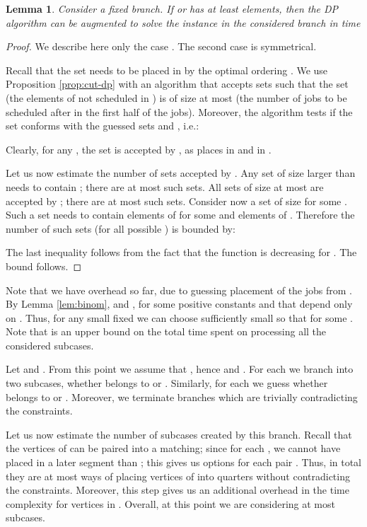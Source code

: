 \documentclass{article}
\newtheorem{lemma}[theorem]{Lemma}
\theoremstyle{definition}
\begin{document}
\begin{lemma}\label{lem:half}
Consider a fixed branch.
If  or  has at least  elements, then the DP algorithm can be augmented to solve the instance in the considered branch in time

\end{lemma}

\begin{proof}
We describe here only the case . The second case is symmetrical.

Recall that the set  needs to be placed in  by the optimal ordering .
We use Proposition \ref{prop:cut-dp} with an algorithm  that accepts sets 
such that the set  (the elements of  not scheduled in ) is of size at most  (the number
of jobs to be scheduled after  in the first half of the jobs).
Moreover, the algorithm  tests if the set  conforms with the guessed sets  and , i.e.:

Clearly, for any , the set  is accepted by ,
as  places  in  and  in .

Let us now estimate the number of sets  accepted by . Any set  of size larger than  needs to contain ; there are
at most  such sets. All sets of size at most  are accepted by ; there
are at most  such sets. 
Consider now a set  of size  for some . Such a set needs to contain
 elements of  for some  and  elements of .
Therefore the number of such sets (for all possible ) is bounded by:

The last inequality follows from the fact that the function  is decreasing for .
The bound  follows.


\end{proof}

Note that we have  overhead so far, due to guessing placement of the jobs from .
By Lemma \ref{lem:binom},  and ,
for some positive constants  and  that depend only on .
Thus, for any small fixed  we can choose  sufficiently small
so that  for some . Note that  is an upper bound on the total time spent on processing all the considered subcases.

Let  and . From this point we assume that , hence 
and .
For each  we branch into two subcases, whether  belongs to  or . Similarly, for each 
we guess whether 
belongs to  or . Moreover, we terminate branches which are trivially contradicting the constraints.

Let us now estimate the number of subcases created by this branch.
Recall that the vertices of  can be paired into a matching; since for each ,  we cannot have  placed in a later segment than ;
this gives us  options for each pair .
Thus, in total they are at most  ways of placing vertices of  into quarters without contradicting the constraints.
Moreover, this step gives us an additional  overhead in the time complexity for vertices in .
Overall, at this point we are considering at most  subcases.
\end{document}
